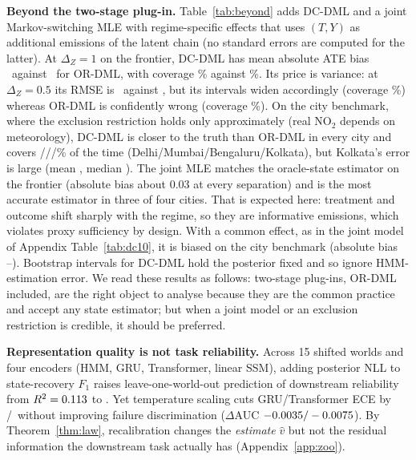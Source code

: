 \documentclass[twoside]{article}
\theoremstyle{definition}
\begin{document}
\textbf{Beyond the two-stage plug-in.} Table~\ref{tab:beyond} adds DC-DML and a joint Markov-switching MLE with regime-specific effects that uses $(T,Y)$ as additional emissions of the latent chain (no standard errors are computed for the latter). At $\Delta_Z=1$ on the frontier, DC-DML has mean absolute ATE bias \RbDCOne\ against \RbOROne\ for OR-DML, with coverage \RbDCCovOne\% against \RbORCovOne\%. Its price is variance: at $\Delta_Z=0.5$ its RMSE is \RbDCRmseHalf\ against \RbORRmseHalf, but its intervals widen accordingly (coverage \RbDCCovHalf\%) whereas OR-DML is confidently wrong (coverage \RbORCovHalf\%). On the city benchmark, where the exclusion restriction holds only approximately (real NO$_2$ depends on meteorology), DC-DML is closer to the truth than OR-DML in every city and covers \RbDCCityCovDelhi/\RbDCCityCovMumbai/\RbDCCityCovBengaluru/\RbDCCityCovKolkata\% of the time (Delhi/Mumbai/Bengaluru/Kolkata), but Kolkata's error is large (mean \RbDCCityKolkata, median \RbDCKolkataMed). The joint MLE matches the oracle-state estimator on the frontier (absolute bias about 0.03 at every separation) and is the most accurate estimator in three of four cities. That is expected here: treatment and outcome shift sharply with the regime, so they are informative emissions, which violates proxy sufficiency by design. With a common effect, as in the joint model of Appendix Table~\ref{tab:dc10}, it is biased on the city benchmark (absolute bias \RbJCommonMin--\RbJCommonMax). Bootstrap intervals for DC-DML hold the posterior fixed and so ignore HMM-estimation error. We read these results as follows: two-stage plug-ins, OR-DML included, are the right object to analyse because they are the common practice and accept any state estimator; but when a joint model or an exclusion restriction is credible, it should be preferred.

\begin{table}[t]
\centering\footnotesize\setlength{\tabcolsep}{3pt}
\caption{Estimators beyond the two-stage plug-in: mean absolute ATE bias (and coverage where intervals exist). Frontier: 100 datasets per cell with learned HMM posteriors; city benchmark: 30 datasets per city (Appendix~\ref{app:ident}). Joint MLE: regime-specific effects, no intervals.}
\label{tab:beyond}
\vspace{1mm}
\resizebox{\columnwidth}{!}{}
\vspace{-3mm}
\end{table}

\textbf{Representation quality is not task reliability.} Across 15 shifted worlds and four encoders (HMM, GRU, Transformer, linear SSM), adding posterior NLL to state-recovery $F_1$ raises leave-one-world-out prediction of downstream reliability from $R^2=0.113$ to \LowoFNll. Yet temperature scaling cuts GRU/Transformer ECE by \ZooEceGRU/\ZooEceTr\ without improving failure discrimination ($\Delta$AUC $-0.0035/-0.0075$). By Theorem~\ref{thm:law}, recalibration changes the \emph{estimate} $\hat v$ but not the residual information the downstream task actually has (Appendix~\ref{app:zoo}).
\end{document}
